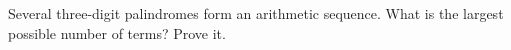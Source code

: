 Several three-digit palindromes form an arithmetic sequence. What is the largest possible number of terms? Prove it.
